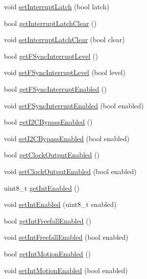 \begin{DoxyCompactItemize}
void \mbox{\hyperlink{class_m_p_u6050_abf9ccf9eb6c7156e6660abb76734920a}{set\+Interrupt\+Latch}} (bool latch)
\item 
bool \mbox{\hyperlink{class_m_p_u6050_a9a098a607e20c64b60e155da35b8264f}{get\+Interrupt\+Latch\+Clear}} ()
\item 
void \mbox{\hyperlink{class_m_p_u6050_a2fa64c7030242aac18bd6727e8ca4a54}{set\+Interrupt\+Latch\+Clear}} (bool clear)
\item 
bool \mbox{\hyperlink{class_m_p_u6050_a60fc85d4f27f99d07ffb9543d5e5f347}{get\+F\+Sync\+Interrupt\+Level}} ()
\item 
void \mbox{\hyperlink{class_m_p_u6050_a2b1c75cfc29e8ff8205f4ff33a426716}{set\+F\+Sync\+Interrupt\+Level}} (bool level)
\item 
bool \mbox{\hyperlink{class_m_p_u6050_a4c01f9ab83b64dbbc6b62e658c3d3d9b}{get\+F\+Sync\+Interrupt\+Enabled}} ()
\item 
void \mbox{\hyperlink{class_m_p_u6050_a96aa409e02cdb7d3671890c70b44f167}{set\+F\+Sync\+Interrupt\+Enabled}} (bool enabled)
\item 
bool \mbox{\hyperlink{class_m_p_u6050_aed33db318a770d0020eb8b84058650f3}{get\+I2\+C\+Bypass\+Enabled}} ()
\item 
void \mbox{\hyperlink{class_m_p_u6050_aa828160756a50f414aa3f5f5f0353c70}{set\+I2\+C\+Bypass\+Enabled}} (bool enabled)
\item 
bool \mbox{\hyperlink{class_m_p_u6050_ada96c33957bf20c04ca598a3537358ef}{get\+Clock\+Output\+Enabled}} ()
\item 
void \mbox{\hyperlink{class_m_p_u6050_a71ec4642b6f6c937bbf6a24fea4179e5}{set\+Clock\+Output\+Enabled}} (bool enabled)
\item 
uint8\+\_\+t \mbox{\hyperlink{class_m_p_u6050_a295c9600579557df065aff88bc7a1d83}{get\+Int\+Enabled}} ()
\item 
void \mbox{\hyperlink{class_m_p_u6050_ac7bcf24249dd5000320a8ec0ffe488c6}{set\+Int\+Enabled}} (uint8\+\_\+t enabled)
\item 
bool \mbox{\hyperlink{class_m_p_u6050_a500bb2df2e46eaecd3fb2ba7304a5ed3}{get\+Int\+Freefall\+Enabled}} ()
\item 
void \mbox{\hyperlink{class_m_p_u6050_a01a24a05f06463d5277e1670d6260e03}{set\+Int\+Freefall\+Enabled}} (bool enabled)
\item 
bool \mbox{\hyperlink{class_m_p_u6050_a7de31a8e9f22765329d9f9e02db2f1f0}{get\+Int\+Motion\+Enabled}} ()
\item 
void \mbox{\hyperlink{class_m_p_u6050_a2d2d1d3b03198a09c83a48ec3bc20bd8}{set\+Int\+Motion\+Enabled}} (bool enabled)

\end{DoxyCompactItemize}
